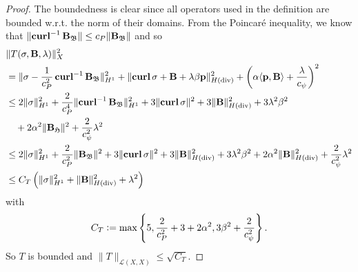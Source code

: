 \documentclass[../master_thesis.tex]{subfiles}
\begin{document}
\begin{proof}
    The boundedness is clear since all operators used in the definition 
    are bounded w.r.t. the norm of their domains. From the Poincaré inequality, we know that 
    $\lVert \veccurl^{-1} \mathbf{B}_\mathfrak{B} \rVert \leq c_P \lVert \mathbf{B}_\mathfrak{B} \rVert$
    and so 
    \begin{align*}
        &\lVert T(\sigma,\mathbf{B},\lambda) \rVert^2 _X 
        \\ &= \lVert \sigma - \frac{1}{c_P^2}\veccurl^{-1}\mathbf{B}_\mathfrak{B} \rVert^2 _{H^1}
            + \lVert \veccurl \sigma + \mathbf{B} + \lambda \beta \mathbf{p} \rVert^2 _{H(\diver)}
             + \left( \alpha \langle \mathbf{p}, \mathbf{B} \rangle  + \frac{\lambda}{c_\psi} \right)^2
        \\ &\leq 2 \lVert \sigma \rVert ^2 _{H^1} 
            +  \frac{2}{c_P^4} \lVert \veccurl^{-1}\mathbf{B}_\mathfrak{B} \rVert ^2 _{H^1}
            + 3 \lVert \veccurl \sigma  \rVert^2 
            + 3 \lVert \mathbf{B} \rVert^2 _{H(\diver)}
            + 3 \lambda^2 \beta^2 
            \\ &\quad+ 2 \alpha^2 \lVert \mathbf{B}_\mathfrak{H}\rVert^2 
            + \frac{2}{c_\psi^2} \lambda^2
        \\ &\leq 2 \lVert \sigma \rVert ^2 _{H^1} 
            + \frac{2}{c_P^2} \lVert \mathbf{B}_\mathfrak{B} \rVert ^2 
            + 3 \lVert \veccurl \sigma  \rVert^2 
            + 3 \lVert \mathbf{B} \rVert^2 _{H(\diver)}
            + 3 \lambda^2 \beta^2 + 2 \alpha^2 \lVert \mathbf{B}\rVert^2 _{H(\diver)}
            + \frac{2}{c_\psi^2} \lambda^2
        \\ &\leq C_T \left( \lVert \sigma \rVert ^2 _{H^1} + \lVert \mathbf{B} \rVert^2 _{H(\diver)} 
            + \lambda^2 \right)
    \end{align*}
    with 
    \begin{align}
        C_T \vcentcolon= \max \left\{ 5, \frac{2}{c_P^2} + 3 + 2\alpha^2, 3 \beta^2 + \frac{2}{c_\psi^2} \right\}.
        \label{eq:bound_on_norm_of_T}
    \end{align}
    So $T$ is bounded and $\lVert T \rVert _{\mathcal{L}(X,X)} \leq \sqrt{C_T}.$


\end{proof}
\end{document}
